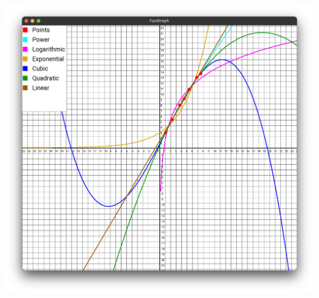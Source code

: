 \documentclass[12pt,one column]{article}
\begin{document}
\includegraphics[width = \textwidth]{img1.png}
\end{document}
